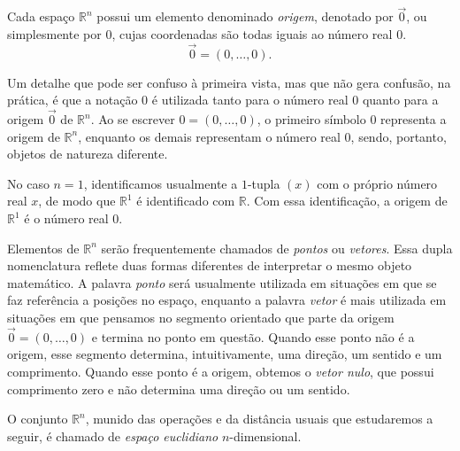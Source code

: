 Cada espaço $\mathbb R^n$ possui um elemento denominado \emph{origem}, denotado por $\vec 0$, ou simplesmente por $0$, cujas coordenadas são todas iguais ao número real $0$.
\begin{equation*}
    \vec 0 = (0, \ldots, 0).
\end{equation*}

Um detalhe que pode ser confuso à primeira vista, mas que não gera confusão, na prática, é que a notação $0$ é utilizada tanto para o número real $0$ quanto para a origem $\vec 0$ de $\mathbb R^n$.
Ao se escrever $0=(0, \ldots, 0)$, o primeiro símbolo $0$ representa a origem de $\mathbb R^n$, enquanto os demais representam o número real $0$, sendo, portanto, objetos de natureza diferente.

No caso $n=1$, identificamos usualmente a $1$-tupla $(x)$ com o próprio número real $x$, de modo que $\mathbb R^1$ é identificado com $\mathbb R$.
Com essa identificação, a origem de $\mathbb R^1$ é o número real $0$.

Elementos de $\mathbb R^n$ serão frequentemente chamados de \emph{pontos} ou \emph{vetores}.
Essa dupla nomenclatura reflete duas formas diferentes de interpretar o mesmo objeto matemático.
A palavra \emph{ponto} será usualmente utilizada em situações em que se faz referência a posições no espaço, enquanto a palavra \emph{vetor} é mais utilizada em situações em que pensamos no segmento orientado que parte da origem $\vec 0=(0, \ldots, 0)$ e termina no ponto em questão.
Quando esse ponto não é a origem, esse segmento determina, intuitivamente, uma direção, um sentido e um comprimento.
Quando esse ponto é a origem, obtemos o \emph{vetor nulo}, que possui comprimento zero e não determina uma direção ou um sentido.

O conjunto $\mathbb R^n$, munido das operações e da distância usuais que estudaremos a seguir, é chamado de \emph{espaço euclidiano} $n$-dimensional.
